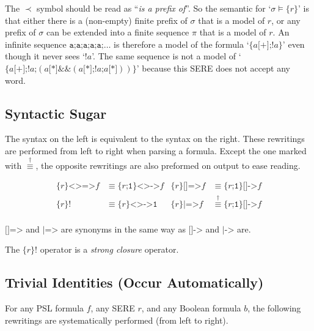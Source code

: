 \documentclass[a4paper,twoside,10pt,DIV=12]{scrreprt}
\DeclareMathOperator{\NOT}{\texttt{!}}
\newcommand{\ANDALT}{\mathbin{\texttt{\&\&}}}
\newcommand{\CONCAT}{\mathbin{\texttt{;}}}
\newcommand{\0}{\texttt{0}}
\newcommand{\1}{\texttt{1}}
\newcommand{\STAR}[1]{\texttt{[*#1]}}
\newcommand{\PLUS}{\texttt{[+]}}
\newcommand{\Esuffix}{\texttt{<>->}}
\newcommand{\Asuffix}{\texttt{[]->}}
\newcommand{\AsuffixALT}{\texttt{|->}}
\newcommand{\EsuffixEQ}{\texttt{<>=>}}
\newcommand{\AsuffixEQ}{\texttt{[]=>}}
\newcommand{\AsuffixALTEQ}{\texttt{|=>}}
\newcommand{\sere}[1]{\texttt{\{}#1\texttt{\}}}
\newcommand{\seren}[1]{\texttt{\{}#1\texttt{\}!}}
\newcommand{\equivM}{\stackrel{\dag}{\equiv}}
\newcommand\samp[1]{`\texttt{#1}'}
\begin{document}
The $\prec$ symbol should be read as ``\emph{is a prefix of}''.  So
the semantic for `$\sigma\vDash \sere{r}$' is that either there is a
(non-empty) finite prefix of $\sigma$ that is a model of $r$, or any
prefix of $\sigma$ can be extended into a finite sequence $\pi$ that
is a model of $r$.  An infinite sequence $\texttt{a;a;a;a;a;}\ldots$
is therefore a model of the formula \samp{$\sere{a\PLUS{}\CONCAT\NOT
    a}$} even though it never sees \samp{$\NOT a$}.  The same sequence
is not a model of \samp{$\sere{a\PLUS{}\CONCAT\NOT
    a\CONCAT(a\STAR{}\ANDALT(a\STAR{}\CONCAT\NOT a\CONCAT
    a\STAR{}))}$} because this SERE does not accept any word.

\subsection{Syntactic Sugar}\label{sec:pslsugar}

The syntax on the left is equivalent to the syntax on the right.
These rewritings are performed from left to right when parsing a
formula.  Except the one marked with $\equivM$, the opposite
rewritings are also preformed on output to ease reading.

\begin{align*}
  \sere{r}\EsuffixEQ f &\equiv \sere{r\CONCAT\1}\Esuffix f &
  \sere{r}\AsuffixEQ f &\equiv \sere{r\CONCAT\1}\Asuffix f\\
  \seren{r} &\equiv \sere{r}\Esuffix \1 &
  \sere{r}\AsuffixALTEQ f &\equivM \sere{r\CONCAT\1}\Asuffix f\\
\end{align*}

$\AsuffixEQ$ and $\AsuffixALTEQ$ are synonyms in the same way as
$\Asuffix$ and $\AsuffixALT$ are.

The $\seren{r}$ operator is a \emph{strong closure} operator.

\subsection{Trivial Identities (Occur Automatically)}

For any PSL formula $f$, any SERE $r$, and any Boolean
formula $b$, the following rewritings are systematically performed
(from left to right).
\end{document}
